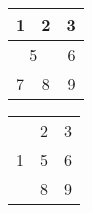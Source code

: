 \documentclass[12pt]{article}  %
\begin{document}
\begin{tabular}{|  l  | c | r | }
  \hline                       
  1 & 2 & 3 \\ \hline
  \multicolumn{2}{|c|}{ 5 } & 6 \\ \hline
  7 & 8 & 9 \\ 
  \hline  
\end{tabular}

\begin{tabular}{|  l  | c | r | }
  \hline      
  \multirow{3}{*}{1} & 2 & 3 \\ \cline{2-3}
   & 5 & 6 \\ \cline{2-3}
   & 8 & 9 \\
  \hline  
\end{tabular}
\end{document}
